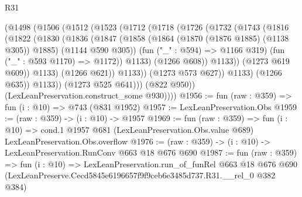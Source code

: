\begin{lexlean}{R31}
\begin{coremodule}
                  (@1498
                    (@1506
                      (@1512
                        (@1523
                          (@1712
                            (@1718
                              (@1726
                                (@1732
                                  (@1743
                                    (@1816
                                      (@1822
                                        (@1830
                                          (@1836
                                            (@1847
                                              (@1858
                                                (@1864 (@1870 (@1876 @1885) (@1138 @305)) @1885)
                                                (@1144 @590 @305))
                                              (fun ("_" : @594) => @1166 @319)
                                              (fun ("_" : @593 @1170) => @1172))
                                            @1133)
                                          (@1266 @608))
                                        @1133))
                                    (@1273 @619 @609))
                                  @1133)
                                (@1266 @621))
                              @1133))
                          (@1273 @573 @627))
                        @1133)
                      (@1266 @635))
                    @1133))
                (@1273 @525 @641)))
            (@822 @950))
          (LexLeanPreservation.construct_some @930))))
@1956 := fun (raw : @359) => fun (i : @10) => @743 (@831 @1952)
@1957 := LexLeanPreservation.Obs
@1959 := (raw : @359) -> (i : @10) -> @1957
@1969 := fun (raw : @359) =>
  fun (i : @10) =>
  cond.{1} @1957 @681 (LexLeanPreservation.Obs.value @689) LexLeanPreservation.Obs.overflow
@1976 := (raw : @359) -> (i : @10) -> LexLeanPreservation.RunConv @663 @18 @676 @690
@1987 := fun (raw : @359) =>
  fun (i : @10) =>
  LexLeanPreservation.run_of_funRel
    @663
    @18
    @676
    @690
    (LexLeanPreserve.Cecd5845e6196657f9f9ceb6e3485d737.R31.__rel_0 @382 @384)
\end{coremodule}
\end{lexlean}
